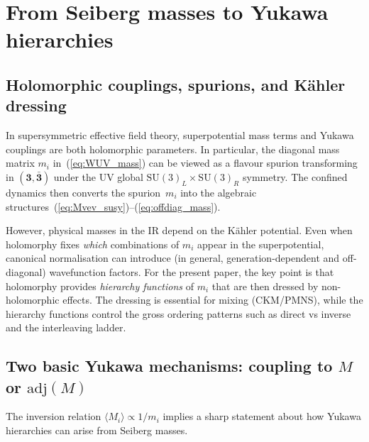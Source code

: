 \documentclass[11pt,a4paper]{article}
\newcommand{\SU}{\mathrm{SU}}
\newcommand{\adj}{\mathrm{adj}}
\begin{document}
\section{From Seiberg masses to Yukawa hierarchies}
\label{sec:yukawa}

\subsection{Holomorphic couplings, spurions, and K\"ahler dressing}
\label{sec:holomorphic}

In supersymmetric effective field theory, superpotential mass terms and
Yukawa couplings are both holomorphic parameters.  In particular, the
diagonal mass matrix $m_i$ in~(\ref{eq:WUV_mass}) can be viewed as a
flavour spurion transforming in $(\mathbf{3},\bar{\mathbf{3}})$ under the
UV global $\SU(3)_L\times \SU(3)_R$ symmetry.
The confined dynamics then converts the spurion~$m_i$ into the algebraic
structures~(\ref{eq:Mvev_susy})--(\ref{eq:offdiag_mass}).

However, physical masses in the IR depend on the K\"ahler potential.
Even when holomorphy fixes \emph{which} combinations of $m_i$ appear in the
superpotential, canonical normalisation can introduce (in general,
generation-dependent and off-diagonal) wavefunction factors.
For the present paper, the key point is that holomorphy provides
\emph{hierarchy functions} of $m_i$ that are then dressed by non-holomorphic
effects.  The dressing is essential for mixing (CKM/PMNS), while the
hierarchy functions control the gross ordering patterns such as direct vs
inverse and the interleaving ladder.

\subsection{Two basic Yukawa mechanisms: coupling to \texorpdfstring{$M$}{M} or \texorpdfstring{$\adj(M)$}{adj(M)}}
\label{sec:two_yukawas}

The inversion relation $\langle M_i\rangle\propto 1/m_i$ implies a sharp
statement about how Yukawa hierarchies can arise from Seiberg masses.
\end{document}
